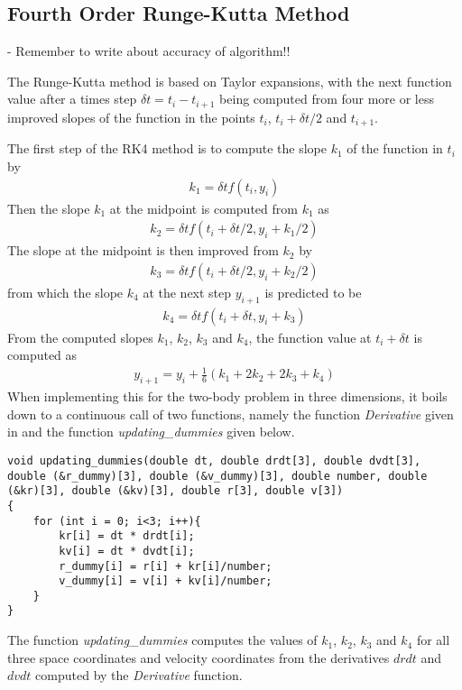 \subsection{Fourth Order Runge-Kutta Method}
\label{sec:methodRK4}
- Remember to write about accuracy of algorithm!!

The Runge-Kutta method is based on Taylor expansions, with the next function value after a times step $\delta t = t_i - t_{i+1}$ being computed from four more or less improved slopes of the function in the points $t_i$, $t_i + \delta t /2$ and $t_{i+1}$.
  
The first step of the RK4 method is to compute the slope $k_1$ of the function in $t_i$ by
\begin{align*}
	k_1 = \delta t f(t_i , y_i)
\end{align*}
Then the slope $k_1$ at the midpoint is computed from $k_1$ as
\begin{align*}
	k_2 = \delta t f(t_i + \delta t /2, y_i + k_1 /2 )
\end{align*}
The slope at the midpoint is then improved from $k_2$ by
\begin{align*}
	k_3 = \delta t f(t_i + \delta t /2, y_i + k_2 /2 )
\end{align*}
from which the slope $k_4$ at the next step $y_{i+1}$ is predicted to be
\begin{align*}
	k_4 = \delta t f(t_i + \delta t, y_i +k_3 )
\end{align*}
From the computed slopes $k_1$, $k_2$, $k_3$ and $k_4$, the function value at $t_i + \delta t$ is computed as
\begin{align}
 y_{i+1} = y_i + \frac{1}{6} (k_1 + 2k_2 + 2k_3 +k_4 )
 \label{eq:RK4nextxtep1}
\end{align}
When implementing this for the two-body problem in three dimensions, it boils down to a continuous call of two functions, namely the function 
\textit{Derivative} given in 
 and the function 
\textit{updating\_dummies} given below.
\begin{lstlisting}
void updating_dummies(double dt, double drdt[3], double dvdt[3], double (&r_dummy)[3], double (&v_dummy)[3], double number, double (&kr)[3], double (&kv)[3], double r[3], double v[3])
{
    for (int i = 0; i<3; i++){
        kr[i] = dt * drdt[i];
        kv[i] = dt * dvdt[i];
        r_dummy[i] = r[i] + kr[i]/number;
        v_dummy[i] = v[i] + kv[i]/number;
    }
}
\end{lstlisting}
The function \textit{updating\_dummies} computes the values of $k_1$, $k_2$, $k_3$ and $k_4$ for all three space coordinates and velocity coordinates from the derivatives $drdt$ and $dvdt$ computed by the \textit{Derivative} function. 
